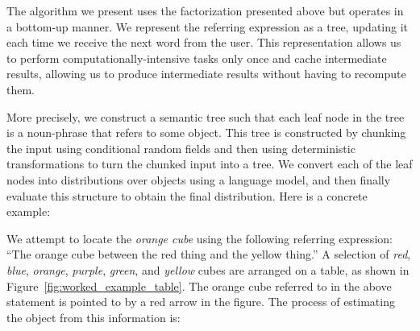 \documentclass[letterpaper,10pt]{article}
\begin{document}
The algorithm we present uses the factorization presented above but operates in a bottom-up manner. We represent the referring expression as a tree, updating it each time we receive the next word from the user. This representation allows us to perform computationally-intensive tasks only once and cache intermediate results, allowing us to produce intermediate results without having to recompute them.

More precisely, we construct a semantic tree such that each leaf node in the tree is a noun-phrase that refers to some object. This tree is constructed by chunking the input using conditional random fields and then using deterministic transformations to turn the chunked input into a tree. We convert each of the leaf nodes into distributions over objects using a language model, and then finally evaluate this structure to obtain the final distribution. Here is a concrete example: 

We attempt to locate the \textit{orange cube} using the following referring expression: ``The orange cube between the red thing and the yellow thing.'' A selection of \textit{red}, \textit{blue}, \textit{orange}, \textit{purple}, \textit{green}, and  \textit{yellow} cubes are arranged on a table, as shown in Figure~\ref{fig:worked_example_table}. The orange cube referred to in the above statement is pointed to by a red arrow in the figure. The process of estimating the object from this information is:
\end{document}
